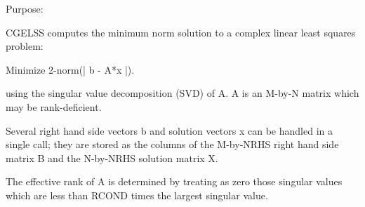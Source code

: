  \begin{DoxyParagraph}{Purpose\+: }
\begin{DoxyVerb} CGELSS computes the minimum norm solution to a complex linear
 least squares problem:

 Minimize 2-norm(| b - A*x |).

 using the singular value decomposition (SVD) of A. A is an M-by-N
 matrix which may be rank-deficient.

 Several right hand side vectors b and solution vectors x can be
 handled in a single call; they are stored as the columns of the
 M-by-NRHS right hand side matrix B and the N-by-NRHS solution matrix
 X.

 The effective rank of A is determined by treating as zero those
 singular values which are less than RCOND times the largest singular
 value.\end{DoxyVerb}
 
\end{DoxyParagraph}

